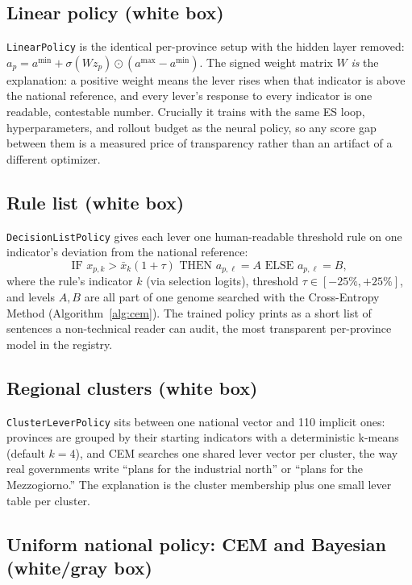 \documentclass[11pt,a4paper]{article}
\newcommand{\code}[1]{\texttt{#1}}
\begin{document}
\subsection{Linear policy (white box)}

\code{LinearPolicy} is the identical per-province setup with the hidden layer
removed: $a_p = a^{\min} + \sigma(W z_p) \odot (a^{\max} - a^{\min})$. The
signed weight matrix $W$ \emph{is} the explanation: a positive weight means
the lever rises when that indicator is above the national reference, and every
lever's response to every indicator is one readable, contestable number.
Crucially it trains with the same ES loop, hyperparameters, and rollout budget
as the neural policy, so any score gap between them is a measured price of
transparency rather than an artifact of a different optimizer.

\subsection{Rule list (white box)}

\code{DecisionListPolicy} gives each lever one human-readable threshold rule
on one indicator's deviation from the national reference:
\begin{equation}
    \text{IF } x_{p,k} > \bar{x}_k (1 + \tau) \text{ THEN } a_{p,\ell} = A
    \text{ ELSE } a_{p,\ell} = B,
\end{equation}
where the rule's indicator $k$ (via selection logits), threshold $\tau \in
[-25\%, +25\%]$, and levels $A, B$ are all part of one genome searched with the
Cross-Entropy Method (Algorithm~\ref{alg:cem}). The trained policy prints as a
short list of sentences a non-technical reader can audit, the most
transparent per-province model in the registry.

\subsection{Regional clusters (white box)}

\code{ClusterLeverPolicy} sits between one national vector and 110 implicit
ones: provinces are grouped by their starting indicators with a deterministic
k-means (default $k=4$), and CEM searches one shared lever vector per cluster,
the way real governments write ``plans for the industrial north'' or
``plans for the Mezzogiorno.'' The explanation is the cluster membership plus
one small lever table per cluster.

\subsection{Uniform national policy: CEM and Bayesian (white/gray box)}
\end{document}
